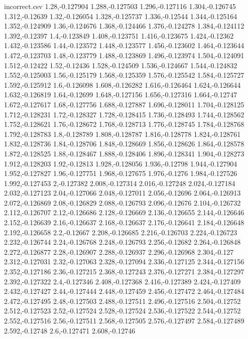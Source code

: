 \begin{filecontents*}{incorrect.csv}
1.28,-0.127904
1.288,-0.127503
1.296,-0.127116
1.304,-0.126745
1.312,-0.12639
1.32,-0.126054
1.328,-0.125737
1.336,-0.12544
1.344,-0.125164
1.352,-0.124909
1.36,-0.124676
1.368,-0.124466
1.376,-0.124278
1.384,-0.124112
1.392,-0.12397
1.4,-0.123849
1.408,-0.123751
1.416,-0.123675
1.424,-0.12362
1.432,-0.123586
1.44,-0.123572
1.448,-0.123577
1.456,-0.123602
1.464,-0.123644
1.472,-0.123703
1.48,-0.123779
1.488,-0.123869
1.496,-0.123974
1.504,-0.124091
1.512,-0.12422
1.52,-0.12436
1.528,-0.124509
1.536,-0.124667
1.544,-0.124832
1.552,-0.125003
1.56,-0.125179
1.568,-0.125359
1.576,-0.125542
1.584,-0.125727
1.592,-0.125912
1.6,-0.126098
1.608,-0.126282
1.616,-0.126464
1.624,-0.126644
1.632,-0.126819
1.64,-0.12699
1.648,-0.127156
1.656,-0.127316
1.664,-0.12747
1.672,-0.127617
1.68,-0.127756
1.688,-0.127887
1.696,-0.128011
1.704,-0.128125
1.712,-0.128231
1.72,-0.128327
1.728,-0.128415
1.736,-0.128493
1.744,-0.128562
1.752,-0.128621
1.76,-0.128672
1.768,-0.128713
1.776,-0.128745
1.784,-0.128768
1.792,-0.128783
1.8,-0.128789
1.808,-0.128787
1.816,-0.128778
1.824,-0.128761
1.832,-0.128736
1.84,-0.128706
1.848,-0.128669
1.856,-0.128626
1.864,-0.128578
1.872,-0.128525
1.88,-0.128467
1.888,-0.128406
1.896,-0.128341
1.904,-0.128273
1.912,-0.128203
1.92,-0.12813
1.928,-0.128056
1.936,-0.12798
1.944,-0.127904
1.952,-0.127827
1.96,-0.127751
1.968,-0.127675
1.976,-0.1276
1.984,-0.127526
1.992,-0.127453
2,-0.127382
2.008,-0.127314
2.016,-0.127248
2.024,-0.127184
2.032,-0.127123
2.04,-0.127066
2.048,-0.127011
2.056,-0.12696
2.064,-0.126913
2.072,-0.126869
2.08,-0.126829
2.088,-0.126793
2.096,-0.12676
2.104,-0.126732
2.112,-0.126707
2.12,-0.126686
2.128,-0.126669
2.136,-0.126655
2.144,-0.126646
2.152,-0.126639
2.16,-0.126637
2.168,-0.126637
2.176,-0.126641
2.184,-0.126648
2.192,-0.126658
2.2,-0.12667
2.208,-0.126685
2.216,-0.126703
2.224,-0.126723
2.232,-0.126744
2.24,-0.126768
2.248,-0.126793
2.256,-0.12682
2.264,-0.126848
2.272,-0.126877
2.28,-0.126907
2.288,-0.126937
2.296,-0.126968
2.304,-0.127
2.312,-0.127031
2.32,-0.127063
2.328,-0.127094
2.336,-0.127125
2.344,-0.127156
2.352,-0.127186
2.36,-0.127215
2.368,-0.127243
2.376,-0.127271
2.384,-0.127297
2.392,-0.127322
2.4,-0.127346
2.408,-0.127368
2.416,-0.127389
2.424,-0.127409
2.432,-0.127427
2.44,-0.127444
2.448,-0.127459
2.456,-0.127472
2.464,-0.127484
2.472,-0.127495
2.48,-0.127503
2.488,-0.127511
2.496,-0.127516
2.504,-0.12752
2.512,-0.127523
2.52,-0.127524
2.528,-0.127524
2.536,-0.127522
2.544,-0.12752
2.552,-0.127516
2.56,-0.127511
2.568,-0.127505
2.576,-0.127497
2.584,-0.127489
2.592,-0.12748
2.6,-0.127471
2.608,-0.12746

\end{filecontents*}
